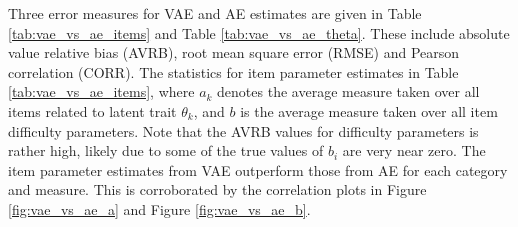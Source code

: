 Three error measures for VAE and AE estimates are given in Table \ref{tab:vae_vs_ae_items} and Table \ref{tab:vae_vs_ae_theta}. These include absolute value relative bias (AVRB), root mean square error (RMSE) and Pearson correlation (CORR). The statistics for item parameter estimates in Table \ref{tab:vae_vs_ae_items}, where $a_k$ denotes the average measure taken over all items related to latent trait $\theta_k$, and $b$ is the average measure taken over all item difficulty parameters. Note that the AVRB values for difficulty parameters is rather high, likely due to some of the true values of $b_i$ are very near zero. The item parameter estimates from VAE outperform those from AE for each category and measure. This is corroborated by the correlation plots in Figure \ref{fig:vae_vs_ae_a} and Figure \ref{fig:vae_vs_ae_b}.

